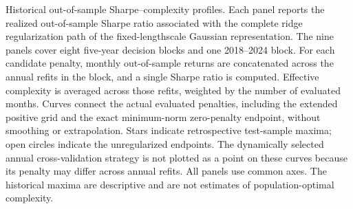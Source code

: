 \caption{Historical out-of-sample Sharpe--complexity profiles.
Each panel reports the realized out-of-sample Sharpe ratio associated with
the complete ridge regularization path of the fixed-lengthscale Gaussian
representation. The nine panels cover eight five-year decision blocks and
one 2018--2024 block. For each candidate penalty, monthly out-of-sample
returns are concatenated across the annual refits in the block, and a single
Sharpe ratio is computed. Effective complexity is averaged across those
refits, weighted by the number of evaluated months. Curves connect the actual
evaluated penalties, including the extended positive grid and the exact
minimum-norm zero-penalty endpoint, without smoothing or extrapolation.
Stars indicate retrospective test-sample maxima; open circles indicate the
unregularized endpoints. The dynamically selected annual cross-validation
strategy is not plotted as a point on these curves because its penalty may
differ across annual refits. All panels use common axes. The historical
maxima are descriptive and are not estimates of population-optimal complexity.}
\label{fig:complexity_nine}
